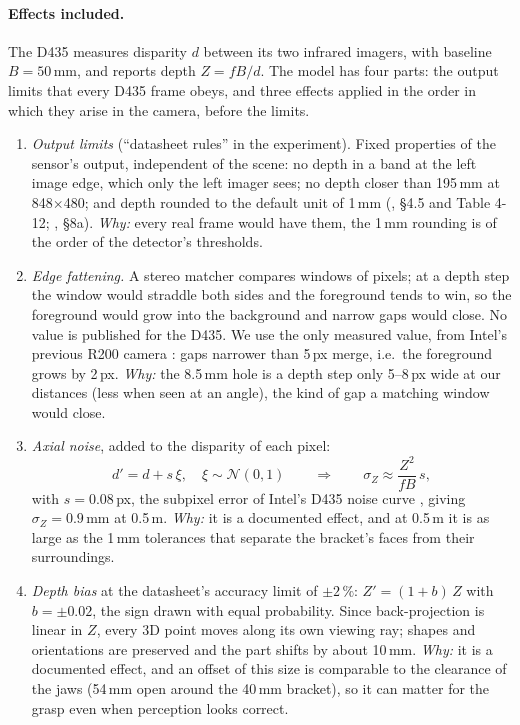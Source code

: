 \documentclass[10pt,a4paper]{article}
\begin{document}
\paragraph{Effects included.} The D435 measures disparity $d$ between its two infrared imagers, with baseline
$B = 50$\,mm, and reports depth $Z = fB/d$. The model has four parts: the output limits that every D435 frame obeys, and
three effects applied in the order in which they arise in the camera, before the limits.

\begin{enumerate}[itemsep=4pt, topsep=6pt, partopsep=0pt, leftmargin=1.5em]

  \item \emph{Output limits} (``datasheet rules'' in the experiment). Fixed properties of the sensor's
  output, independent of the scene: no depth in a band at the left image edge, which only the left imager
  sees; no depth closer than 195\,mm at 848$\times$480; and depth rounded to the default unit of 1\,mm
  (\cite{d435ds}, §4.5 and Table 4-12; \cite{bkm}, §8a). \emph{Why:} every real frame would have them, the 1\,mm rounding is of the order of the detector's thresholds.


  \item \emph{Edge fattening.} A stereo matcher compares windows of pixels; at a depth step the window
  would straddle both sides and the foreground tends to win, so the foreground would grow into the background
  and narrow gaps would close. No value is published for the D435. We use the only measured value, from Intel's previous R200
  camera \cite{keselman}: gaps narrower than 5\,px merge, i.e.\ the foreground grows by 2\,px. 
  \emph{Why:}
the 8.5\,mm hole is a depth step only 5--8\,px wide at our distances (less when seen at an angle), the kind of gap a matching
window would close.


\item \emph{Axial noise}, added to the disparity of each pixel:
  \begin{equation}
    d' = d + s\,\xi,\quad \xi \sim \mathcal N(0,1)
    \qquad\Rightarrow\qquad
    \sigma_Z \approx \frac{Z^2}{fB}\,s ,
  \end{equation}
  with $s = 0.08$\,px, the subpixel error of Intel's D435 noise curve \cite{bkm}, giving $\sigma_Z = 0.9$\,mm at 0.5\,m. 
  \emph{Why:} it is a documented effect, and at 0.5\,m it is as large as the 1\,mm tolerances that separate the
  bracket's faces from their surroundings.



  \item \emph{Depth bias} at the datasheet's accuracy limit of $\pm 2\,\%$: $Z' = (1+b)\,Z$ with
  $b = \pm 0.02$, the sign drawn with equal probability. Since back-projection is linear in $Z$, every 3D point
  moves along its own viewing ray; shapes and orientations are preserved and the part shifts by about 10\,mm. 
  \emph{Why:} it is a documented effect, and an offset of this size is comparable to the clearance of the jaws (54\,mm open
  around the 40\,mm bracket), so it can matter for the grasp even when perception looks correct.
\end{enumerate}
\end{document}
